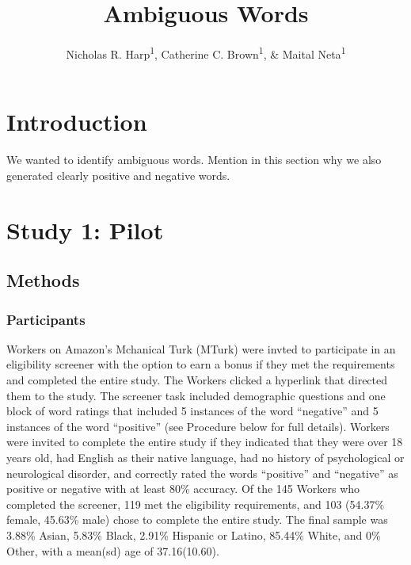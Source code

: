 \documentclass[man]{apa6}
\title{Ambiguous Words}
\author{Nicholas R. Harp\textsuperscript{1}, Catherine C. Brown\textsuperscript{1}, \& Maital Neta\textsuperscript{1}}
\date{}
\affiliation{
\vspace{0.5cm}
\textsuperscript{1} University of Nebraska-Lincoln}
\begin{document}
\maketitle

\hypertarget{introduction}{%
\section{Introduction}\label{introduction}}

We wanted to identify ambiguous words. Mention in this section why we also generated clearly positive and negative words.

\hypertarget{study-1-pilot}{%
\section{Study 1: Pilot}\label{study-1-pilot}}

\hypertarget{methods}{%
\subsection{Methods}\label{methods}}

\hypertarget{participants}{%
\subsubsection{Participants}\label{participants}}

Workers on Amazon's Mchanical Turk (MTurk) were invted to participate in an eligibility screener with the option to earn a bonus if they met the requirements and completed the entire study. The Workers clicked a hyperlink that directed them to the study. The screener task included demographic questions and one block of word ratings that included 5 instances of the word \enquote{negative} and 5 instances of the word \enquote{positive} (see Procedure below for full details). Workers were invited to complete the entire study if they indicated that they were over 18 years old, had English as their native language, had no history of psychological or neurological disorder, and correctly rated the words \enquote{positive} and \enquote{negative} as positive or negative with at least 80\% accuracy. Of the 145 Workers who completed the screener, 119 met the eligibility requirements, and 103 (54.37\% female, 45.63\% male) chose to complete the entire study. The final sample was 3.88\% Asian, 5.83\% Black, 2.91\% Hispanic or Latino, 85.44\% White, and 0\% Other, with a mean(sd) age of 37.16(10.60).
\end{document}
